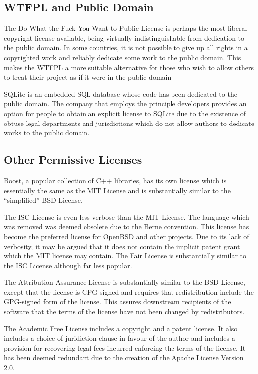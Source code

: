 \documentclass[12pt,letterpaper]{article}
\begin{document}
\subsection{WTFPL and Public Domain}

The Do What the Fuck You Want to Public License is perhaps the most liberal copyright license available, being virtually indistinguishable from dedication to the public domain. In some countries, it is not possible to give up all rights in a copyrighted work and reliably dedicate some work to the public domain. This makes the WTFPL a more suitable alternative for those who wish to allow others to treat their project as if it were in the public domain.

SQLite is an embedded SQL database whose code has been dedicated to the public domain. The company that employs the principle developers provides an option for people to obtain an explicit license to SQLite due to the existence of obtuse legal departments and jurisdictions which do not allow authors to dedicate works to the public domain.

\subsection{Other Permissive Licenses}

Boost, a popular collection of C++ libraries, has its own license which is essentially the same as the MIT License and is substantially similar to the ``simplified'' BSD License.

The ISC License is even less verbose than the MIT License. The language which was removed was deemed obsolete due to the Berne convention. This license has become the preferred license for OpenBSD and other projects. Due to its lack of verbosity, it may be argued that it does not contain the implicit patent grant which the MIT license may contain. The Fair License is substantially similar to the ISC License although far less popular.

The Attribution Assurance License is substantially similar to the BSD License, except that the license is GPG-signed and requires that redistribution include the GPG-signed form of the license. This assures downstream recipients of the software that the terms of the license have not been changed by redistributors.

The Academic Free License includes a copyright and a patent license. It also includes a choice of juridiction clause in favour of the author and includes a provision for recovering legal fees incurred enforcing the terms of the license. It has been deemed redundant due to the creation of the Apache License Version 2.0.
\end{document}
